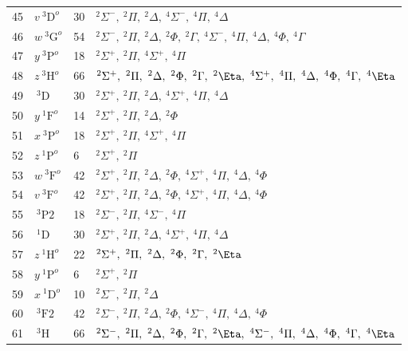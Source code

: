 \begin{table*}[]
\begin{tabular*}{\textwidth}{llll@{\extracolsep{\fill}}}
 45 & $ v~^3\mathrm{D}^o $ &   30& $   ^{2}\Sigma^-,\  ^{2}\Pi,\     ^{2}\Delta,\   ^{4}\Sigma^-,\  ^{4}\Pi,\     ^{4}\Delta$ \\
 46 & $ w~^3\mathrm{G}^o $ &   54& $   ^{2}\Sigma^-,\  ^{2}\Pi,\     ^{2}\Delta,\ ^{2}\Phi,\     ^{2}\Gamma,\   ^{4}\Sigma^-,\  ^{4}\Pi,\     ^{4}\Delta,\ ^{4}\Phi,\     ^{4}\Gamma$ \\
 47 & $ y~^3\mathrm{P}^o $ &   18& $   ^{2}\Sigma^+,\  ^{2}\Pi,\   ^{4}\Sigma^+,\  ^{4}\Pi$ \\
 48 & $ z~^3\mathrm{H}^o $ &   66& $   ^{2}\Sigma^+,\  ^{2}\Pi,\     ^{2}\Delta,\ ^{2}\Phi,\     ^{2}\Gamma,\ ^{2}\Eta,\   ^{4}\Sigma^+,\  ^{4}\Pi,\     ^{4}\Delta,\ ^{4}\Phi,\     ^{4}\Gamma,\ ^{4}\Eta$ \\
 49 & $    ~^3\mathrm{D} $ &   30& $   ^{2}\Sigma^+,\  ^{2}\Pi,\     ^{2}\Delta,\   ^{4}\Sigma^+,\  ^{4}\Pi,\     ^{4}\Delta$ \\
 50 & $ y~^1\mathrm{F}^o $ &   14& $   ^{2}\Sigma^+,\  ^{2}\Pi,\     ^{2}\Delta,\ ^{2}\Phi$ \\
 51 & $ x~^3\mathrm{P}^o $ &   18& $   ^{2}\Sigma^+,\  ^{2}\Pi,\   ^{4}\Sigma^+,\  ^{4}\Pi$ \\
 52 & $ z~^1\mathrm{P}^o $ &    6& $   ^{2}\Sigma^+,\  ^{2}\Pi$ \\
 53 & $ w~^3\mathrm{F}^o $ &   42& $   ^{2}\Sigma^+,\  ^{2}\Pi,\     ^{2}\Delta,\ ^{2}\Phi,\   ^{4}\Sigma^+,\  ^{4}\Pi,\     ^{4}\Delta,\ ^{4}\Phi$ \\
 54 & $ v~^3\mathrm{F}^o $ &   42& $   ^{2}\Sigma^+,\  ^{2}\Pi,\     ^{2}\Delta,\ ^{2}\Phi,\   ^{4}\Sigma^+,\  ^{4}\Pi,\     ^{4}\Delta,\ ^{4}\Phi$ \\
 55 & $   ~^3\mathrm{P}2 $ &   18& $   ^{2}\Sigma^-,\  ^{2}\Pi,\   ^{4}\Sigma^-,\  ^{4}\Pi$ \\
 56 & $    ~^1\mathrm{D} $ &   30& $   ^{2}\Sigma^+,\  ^{2}\Pi,\     ^{2}\Delta,\   ^{4}\Sigma^+,\  ^{4}\Pi,\     ^{4}\Delta$ \\
 57 & $ z~^1\mathrm{H}^o $ &   22& $   ^{2}\Sigma^+,\  ^{2}\Pi,\     ^{2}\Delta,\ ^{2}\Phi,\     ^{2}\Gamma,\ ^{2}\Eta$ \\
 58 & $ y~^1\mathrm{P}^o $ &    6& $   ^{2}\Sigma^+,\  ^{2}\Pi$ \\
 59 & $ x~^1\mathrm{D}^o $ &   10& $   ^{2}\Sigma^-,\  ^{2}\Pi,\     ^{2}\Delta$ \\
 60 & $   ~^3\mathrm{F2} $ &   42& $   ^{2}\Sigma^-,\  ^{2}\Pi,\     ^{2}\Delta,\ ^{2}\Phi,\   ^{4}\Sigma^-,\  ^{4}\Pi,\     ^{4}\Delta,\ ^{4}\Phi$ \\
 61 & $    ~^3\mathrm{H} $ &   66& $   ^{2}\Sigma^-,\  ^{2}\Pi,\     ^{2}\Delta,\ ^{2}\Phi,\     ^{2}\Gamma,\ ^{2}\Eta,\   ^{4}\Sigma^-,\  ^{4}\Pi,\     ^{4}\Delta,\ ^{4}\Phi,\     ^{4}\Gamma,\ ^{4}\Eta$ \\

\end{tabular*}
\end{table*}
